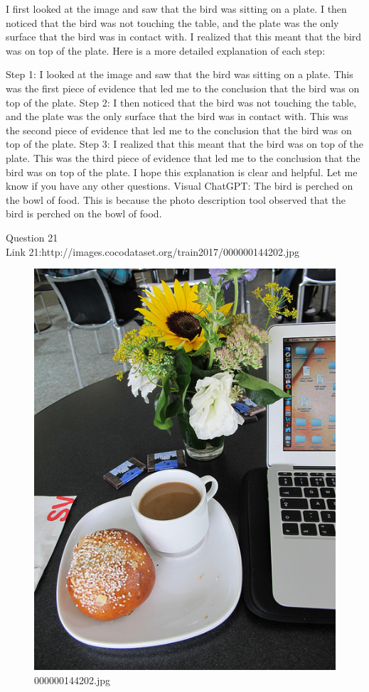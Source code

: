 \begin{enumerate}
        I first looked at the image and saw that the bird was sitting on a plate.
        I then noticed that the bird was not touching the table, and the plate was the only surface that the bird was in contact with.
        I realized that this meant that the bird was on top of the plate.
        Here is a more detailed explanation of each step:

        Step 1: I looked at the image and saw that the bird was sitting on a plate. This was the first piece of evidence that led me to the conclusion that the bird was on top of the plate.
        Step 2: I then noticed that the bird was not touching the table, and the plate was the only surface that the bird was in contact with. This was the second piece of evidence that led me to the conclusion that the bird was on top of the plate.
        Step 3: I realized that this meant that the bird was on top of the plate. This was the third piece of evidence that led me to the conclusion that the bird was on top of the plate.
        I hope this explanation is clear and helpful. Let me know if you have any other questions.
        \subitem Visual ChatGPT: The bird is perched on the bowl of food. This is because the photo description tool observed that the bird is perched on the bowl of food.
    \end{enumerate}
Question 21\\
Link 21:http://images.cocodataset.org/train2017/000000144202.jpg
    \begin{figure}[h]
        \centering
        \includegraphics[width=0.8\linewidth]{../image set/easy/000000144202.jpg}
        \caption{000000144202.jpg}
    \end{figure}
